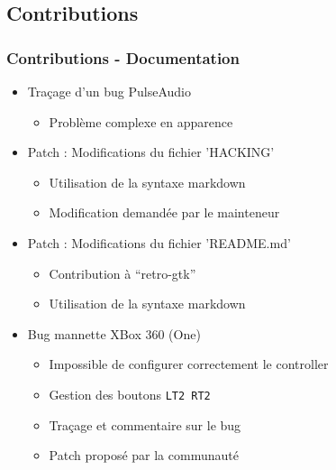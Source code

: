 \documentclass{beamer}
\begin{document}
\subsection{Contributions}
\begin{frame}
  \frametitle{Contributions - Documentation}
  \begin{itemize}
  \item Traçage d'un bug PulseAudio
    \begin{itemize}
      \item Problème complexe en apparence
    \end{itemize}
  \item Patch : Modifications du fichier 'HACKING'
    \begin{itemize}
    \item Utilisation de la syntaxe markdown
    \item Modification demandée par le mainteneur
    \end{itemize}
  \item Patch : Modifications du fichier 'README.md'
    \begin{itemize}
    \item Contribution à ``retro-gtk''
    \item Utilisation de la syntaxe markdown
    \end{itemize}
  \item Bug mannette XBox 360 (One)
    \begin{itemize}
    \item Impossible de configurer correctement le controller
    \item Gestion des boutons \texttt{LT2 RT2}
    \item Traçage et commentaire sur le bug
    \item Patch proposé par la communauté
    \end{itemize}
  \end{itemize}
\end{frame}
\end{document}
